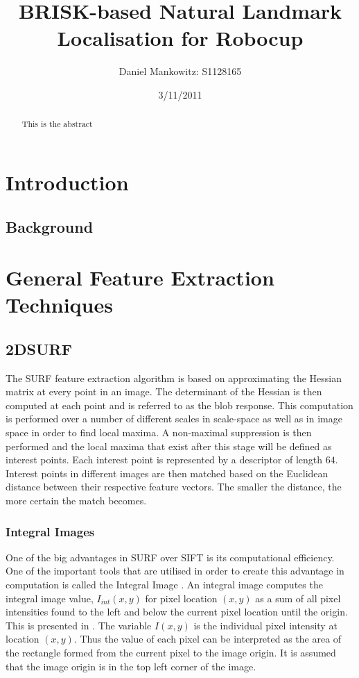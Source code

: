 \documentclass{article}
\title{BRISK-based Natural Landmark Localisation for Robocup}
\author{Daniel Mankowitz: S1128165}
\date{3/11/2011}
\begin{document}
\maketitle

\newpage
\begin{abstract}
This is the abstract
\end{abstract}

\section{Introduction}
\label{sec:introduction}

\subsection{Background}
\label{sec:background}

\section{General Feature Extraction Techniques}
\label{sec:genFeatureExtract}

\subsection{2DSURF}
\label{sec:2dsurf}
The SURF feature extraction algorithm is based on approximating the Hessian matrix at every point in an image. The determinant of the Hessian is then computed at each point and is referred to as the blob response. This computation is performed over a number of different scales in scale-space as well as in image space in order to find local maxima. A non-maximal suppression is then performed and the local maxima that exist after this stage will be defined as interest points. Each interest point is represented by a descriptor of length $64$. Interest points in different images are then matched based on the Euclidean distance between their respective feature vectors. The smaller the distance, the more certain the match becomes. 

\subsubsection{Integral Images}
\label{sec:integralImages}
One of the big advantages in SURF over SIFT \cite{Lowe2004} is its computational efficiency. One of the important tools that are utilised in order to create this advantage in computation is called the Integral Image \cite{Bay2008}. An integral image computes the integral image value, $I_{int}(x,y)$ for pixel location $(x,y)$  as a sum of all pixel intensities found to the left and below the current pixel location until the origin. This is presented in . The variable $I(x,y)$ is the individual pixel intensity at location $(x,y)$. Thus the value of each pixel can be interpreted as the area of the rectangle formed from the current pixel to the image origin. It is assumed that the image origin is in the top left corner of the image. \\
\end{document}
